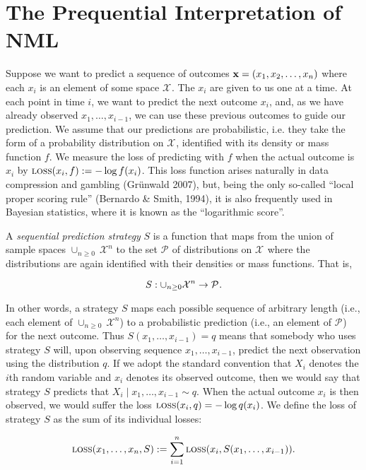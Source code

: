\documentclass[authoryear]{elsarticle}
\newcommand{\loss}{\mbox{\sc loss}}
\newcommand{\sspace}[2]{\mathcal{#1}^{#2}}
\newcommand{\vx}{\ensuremath{{\bf x}}}
\begin{document}
\appendix
\section{The Prequential Interpretation of NML}
Suppose we want to predict a sequence of outcomes $\vx =(x_1,
x_2, \ldots, x_n)$ where each $x_i$ is an element of some space
${\sspace{X}{}}$. The $x_i$ are given to us one at a time. At each point in time
$i$, we want to predict the next outcome $x_i$, and, as we have already observed $x_1,
\ldots, x_{i-1}$, we can use these previous outcomes to guide our
prediction. We assume that our predictions are probabilistic, i.e.
they take the form of a probability distribution on ${\sspace{X}{}}$,
identified with its density or mass function $f$. We measure the loss
of predicting with $f$ when the actual outcome is $x_i$ by
$\loss(x_i,f) := - \log f(x_i)$. This loss function arises naturally
in data compression and gambling (Gr\"unwald 2007), but, being the
only so-called ``local proper scoring rule'' (Bernardo \& Smith,
1994), it is also frequently used in Bayesian statistics, where it is
known as the ``logarithmic score''.

A {\em sequential prediction strategy\/} $S$ is a function that maps from
the union of sample spaces $\cup_{n \geq 0} \ {\sspace{X}{n}}$ to the
set $\sspace{P}{}$ of distributions on $\sspace{X}{}$ where the
distributions are again identified with their
densities or mass functions. That is,

\vspace*{-12pt}
$$S: \cup_{n
  \geq 0} \/ {\sspace{X}{n}} \rightarrow {\sspace{P}{}}.$$

In other words, a strategy $S$ maps each possible sequence of arbitrary
length (i.e., each element of $\cup_{n \geq 0} \ {\sspace{X}{n}}$) to
a probabilistic prediction (i.e., an element of $\sspace{P}{}$) for the
next outcome.
Thus $S(x_1, \ldots, x_{i-1}) = q$ means that somebody who uses
strategy $S$ will, upon observing sequence $x_1, \ldots, x_{i-1}$,
predict the next observation using the distribution $q$. If we adopt the
standard convention that $X_i$ denotes the $i$th random variable and $x_i$ denotes
its observed outcome, then we would say that
strategy $S$ predicts that $X_i \mid x_1, \ldots, x_{i-1} \sim q$. When the actual outcome $x_i$ is then
observed, we would suffer the loss $\loss(x_i,q) = - \log q(x_i)$. We
define the loss of strategy $S$ as the sum of its individual losses:

\vspace*{-12pt}
$$\loss(x_1, \ldots, x_n, S) := \sum_{i=1}^n \loss(x_i,S(x_1, \ldots, x_{i-1})).$$
\end{document}
